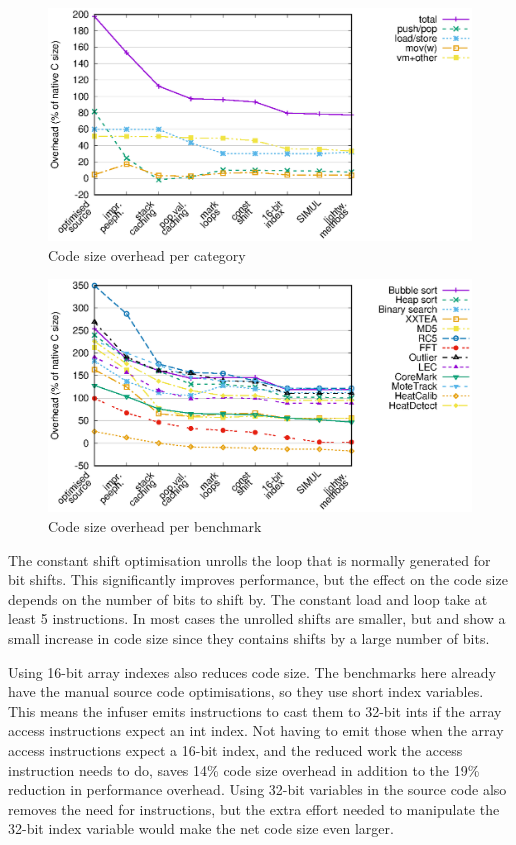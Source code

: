 \begin{figure}
\centering
\includegraphics[width=\mygraphsize]{codesizeoverhead-per-opcode-category3a.eps}
\caption{Code size overhead per category}
\label{fig-codesize-per-opcode-category}
\end{figure}

\begin{figure}
\centering
\includegraphics[width=\mygraphsize]{codesizeoverhead-per-benchmark3a.eps}
\caption{Code size overhead per benchmark}
\label{fig-codesize-per-benchmark}
\end{figure}

The constant shift optimisation unrolls the loop that is normally generated for bit shifts. This significantly improves performance, but the effect on the code size depends on the number of bits to shift by. The constant load and loop take at least 5 instructions. In most cases the unrolled shifts are smaller, but  and  show a small increase in code size since they contains shifts by a large number of bits.

Using 16-bit array indexes also reduces code size. The benchmarks here already have the manual source code optimisations, so they use short index variables. This means the infuser emits  instructions to cast them to 32-bit ints if the array access instructions expect an int index. Not having to emit those when the array access instructions expect a 16-bit index, and the reduced work the access instruction needs to do, saves 14\% code size overhead in addition to the 19\% reduction in performance overhead. Using 32-bit variables in the source code also removes the need for  instructions, but the extra effort needed to manipulate the 32-bit index variable would make the net code size even larger.


